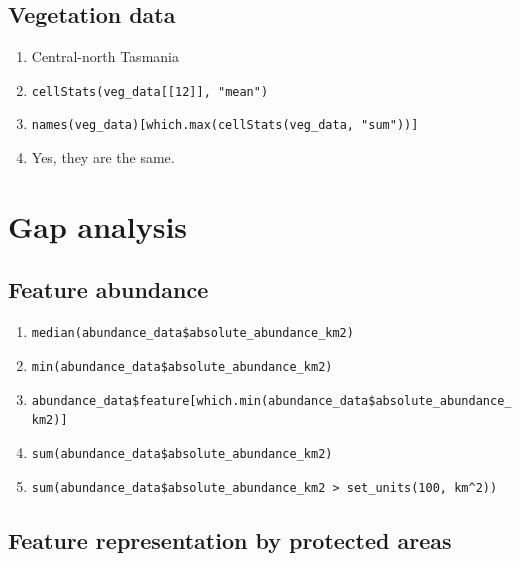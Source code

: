\documentclass[12pt,]{book}
\providecommand{\tightlist}{%
  \setlength{\itemsep}{0pt}\setlength{\parskip}{0pt}}
\let\BeginKnitrBlock\begin \let\EndKnitrBlock\end
\begin{document}
\clearpage

\subsection{Vegetation data}\label{vegetation-data-1}

\BeginKnitrBlock{rmdanswer}
\begin{enumerate}
\def\labelenumi{\arabic{enumi}.}
\tightlist
\item
  Central-north Tasmania
\item
  \texttt{cellStats(veg\_data{[}{[}12{]}{]},\ "mean")}
\item
  \texttt{names(veg\_data){[}which.max(cellStats(veg\_data,\ "sum")){]}}
\item
  Yes, they are the same.
\end{enumerate}
\EndKnitrBlock{rmdanswer}

\section{Gap analysis}\label{gap-analysis}

\subsection{Feature abundance}\label{feature-abundance-1}

\BeginKnitrBlock{rmdanswer}
\begin{enumerate}
\def\labelenumi{\arabic{enumi}.}
\tightlist
\item
  \texttt{median(abundance\_data\$absolute\_abundance\_km2)}
\item
  \texttt{min(abundance\_data\$absolute\_abundance\_km2)}
\item
  \texttt{abundance\_data\$feature{[}which.min(abundance\_data\$absolute\_abundance\_km2){]}}
\item
  \texttt{sum(abundance\_data\$absolute\_abundance\_km2)}
\item
  \texttt{sum(abundance\_data\$absolute\_abundance\_km2\ \textgreater{}\ set\_units(100,\ km\^{}2))}
\end{enumerate}
\EndKnitrBlock{rmdanswer}

\subsection{Feature representation by protected
areas}\label{feature-representation-by-protected-areas-1}
\end{document}
